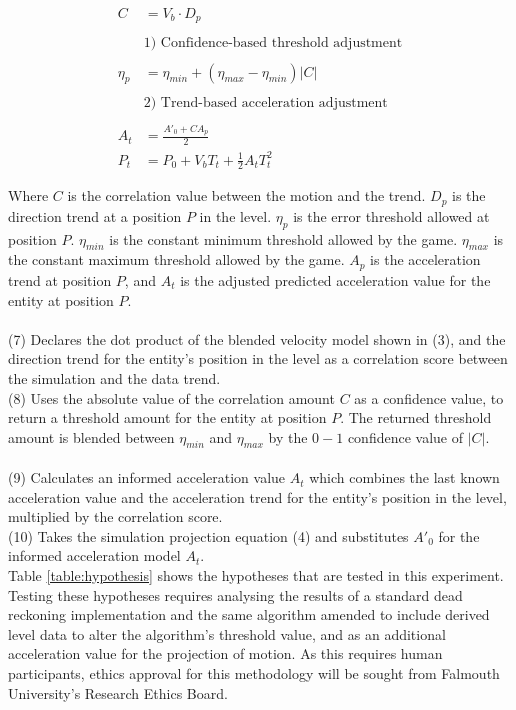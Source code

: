 \documentclass[journal]{IEEEtran}
\begin{document}
\begin{align}
        C & = {V_b} \cdot {D_p} \\
        \nonumber \\
        & \text{1) Confidence-based threshold adjustment} \nonumber \\
        \nonumber \\
        \eta_p & = {\eta_{min}} + ({\eta_{max}} - {\eta_{min}}) |C| \\
        \nonumber \\
        & \text{2) Trend-based acceleration adjustment} \nonumber \\
        \nonumber \\
        A_t & = \frac{{A'_0} + C {A_p}}{2} \\
        P_t & = P_0 + {V_b}{T_t} + \frac{1}{2} {A_t} {T_t^2}
\end{align} 

Where $C$ is the correlation value between the motion and the trend. $D_p$ is the direction trend at a position $P$ in the level. $\eta_p$ is the error threshold allowed at position $P$. $\eta_{min}$ is the constant minimum threshold allowed by the game. $\eta_{max}$ is the constant maximum threshold allowed by the game. $A_p$ is the acceleration trend at position $P$, and $A_t$ is the adjusted predicted acceleration value for the entity at position $P$. \\
\\
(7) Declares the dot product of the blended velocity model shown in (3), and the direction trend for the entity's position in the level as a correlation score between the simulation and the data trend. \\
(8) Uses the absolute value of the correlation amount $C$ as a confidence value, to return a threshold amount for the entity at position $P$. The returned threshold amount is blended between $\eta_{min}$ and $\eta_{max}$ by the $0 - 1$ confidence value of $|C|$. \\
\\
(9) Calculates an informed acceleration value $A_t$ which combines the last known acceleration value and the acceleration trend for the entity's position in the level, multiplied by the correlation score. \\
(10) Takes the simulation projection equation (4) and substitutes $A'_0$ for the informed acceleration model $A_t$. \\ 

Table \ref{table:hypothesis} shows the hypotheses that are tested in this experiment. Testing these hypotheses requires analysing the results of a standard dead reckoning implementation and the same algorithm amended to include derived level data to alter the algorithm's threshold value, and as an additional acceleration value for the projection of motion. As this requires human participants, ethics approval for this methodology will be sought from Falmouth University’s Research Ethics Board.
\end{document}
